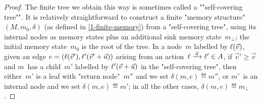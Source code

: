 \begin{proof}
  The finite tree we obtain this way is sometimes called a
  ""self-covering tree"".  %
  It is relatively straightforward to construct a finite "memory
  structure"~$(M,m_0,\delta)$ (as defined in \cref{1-finite-memory}) from a
  "self-covering tree", using its internal nodes as memory states plus
  an additional sink memory state~$m_\bot$; the initial memory
  state~$m_0$ is the root of the tree.  In a node~$m$ labelled by
  $\ell(\vec v)$, given an edge
  $e=(\ell(\vec v'),\ell'(\vec v'+\vec u))$ arising from an
  action~$\loc\step{\vec u}\loc'\in\Act$, if $\vec v'\geq\vec v$ and
  $m$~has a child~$m'$ labelled by $\ell'(\vec v+\vec u)$ in the
  "self-covering tree", then either~$m'$ is a leaf with "return
  node"~$m''$ and we set $\delta(m,e)\eqdef m''$, or $m'$~is an
  internal node and we set $\delta(m,e)\eqdef m'$; in all the other
  cases, $\delta(m,e)\eqdef m_\bot$. %
\end{proof}

